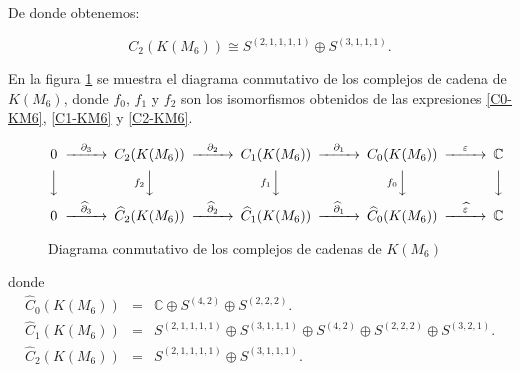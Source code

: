 \documentclass[12pt]{book}
\theoremstyle{definition}
\newcounter{in}
\begin{document}
De donde obtenemos:

\begin{equation}
  C_{2}(K(M_{6}))\cong S^{(2,1,1,1,1)}\oplus S^{(3,1,1,1)}.
  \label{C2-KM6}
\end{equation}

En la figura \ref{fig:diagrama-conmutativo-clanes6} se muestra el diagrama
conmutativo de los complejos de cadena de $K(M_{6})$, donde $f_{0}$,
$f_{1}$ y $f_{2}$ son los isomorfismos obtenidos de las expresiones
\ref{C0-KM6}, \ref{C1-KM6} y \ref{C2-KM6}.

\begin{figure}[h]
  \centering
    \[
    \begin{CD}
      0 @>{\partial_{3}}>> C_{2}(K(M_{6})) @>{\partial_{2}}>> C_{1}(K(M_{6})) @>{\partial_{1}}>> C_{0}(K(M_{6})) @>{\varepsilon}>> \mathbb{C}\\
      @VVV   @Vf_{2}VV   @Vf_{1}VV   @Vf_{0}VV   @VVV    \\
      0  @>{\widehat\partial_{3}}>> \widehat C_{2}(K(M_{6}))
      @>{\widehat\partial_{2}}>>  \widehat C_{1}(K(M_{6}))
      @>{\widehat\partial_{1}}>> \widehat C_{0}(K(M_{6}))
      @>{\widehat\varepsilon}>> \mathbb{C}
    \end{CD}
    \]
  
  \caption{Diagrama conmutativo de los complejos de cadenas de $K(M_{6})$}
  \label{fig:diagrama-conmutativo-clanes6}
\end{figure}
donde
\begin{eqnarray*}
  \widehat C_{0}(K(M_{6}))&=&\mathbb{C} \oplus S^{(4,2)}\oplus S^{(2,2,2)}.\\
  \widehat C_{1}(K(M_{6}))&=&S^{(2,1,1,1,1)}\oplus S^{(3,1,1,1)}\oplus S^{(4,2)}\oplus S^{(2,2,2)}\oplus S^{(3,2,1)}.\\
  \widehat C_{2}(K(M_{6}))&=&S^{(2,1,1,1,1)}\oplus S^{(3,1,1,1)}. 
\end{eqnarray*}
  
\end{document}

